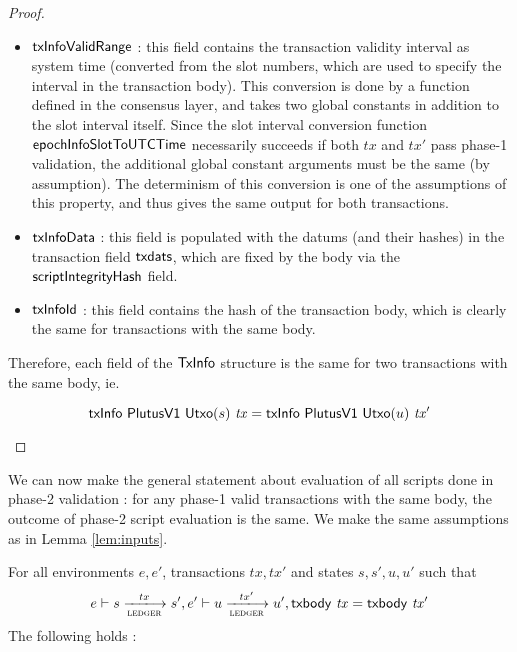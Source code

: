 \begin{property}
\begin{proof}
\begin{itemize}
\begin{itemize}
        \item $\mathsf{txInfoValidRange}$ : this field contains the transaction
        validity interval as system time (converted from the slot numbers, which are
        used to specify the interval in the transaction body). This conversion is
        done by a function defined in the consensus layer, and takes two global
        constants in addition to the slot interval itself. Since the slot interval
        conversion function $\mathsf{epochInfoSlotToUTCTime}$ necessarily
        succeeds if both $tx$ and $tx'$ pass phase-1 validation, the additional
        global constant arguments must be the same (by assumption). The determinism of this conversion
        is one of the assumptions of this property, and thus gives the same output
        for both transactions.

        \item $\mathsf{txInfoData}$ : this field is populated with the datums (and their
        hashes) in the transaction field $\mathsf{txdats}$, which are fixed by the body
        via the $\mathsf{scriptIntegrityHash}$ field.

        \item $\mathsf{txInfoId}$ : this field contains the hash of the transaction body,
        which is clearly the same for transactions with the same body.
      \end{itemize}

      Therefore, each field of the $\mathsf{TxInfo}$ structure is
      the same for two transactions with the same body, ie.

      \[ \mathsf{txInfo}~\mathsf{PlutusV1}~\mathsf{Utxo}(s)~\mathit{tx} = \mathsf{txInfo}~\mathsf{PlutusV1}~\mathsf{Utxo}(u)~\mathit{tx'}\]

    \end{itemize}
\end{proof}

We can now make the general statement about evaluation of all scripts done in
phase-2 validation : for any phase-1 valid transactions with the same body,
the outcome of phase-2 script evaluation is the same. We make the same assumptions
as in Lemma \ref{lem:inputs}.

\begin{corollary}
  For all environments $e, e'$, transactions $tx, tx'$ and states $s, s', u, u'$ such that
  \begin{equation*}
    e\vdash s\trans{ledger}{tx}s', \\
    e'\vdash u\trans{ledger}{tx'}u', \\
    \txbody{tx} = \txbody{tx'}
  \end{equation*}
  The following holds :


\end{corollary}
\end{property}
